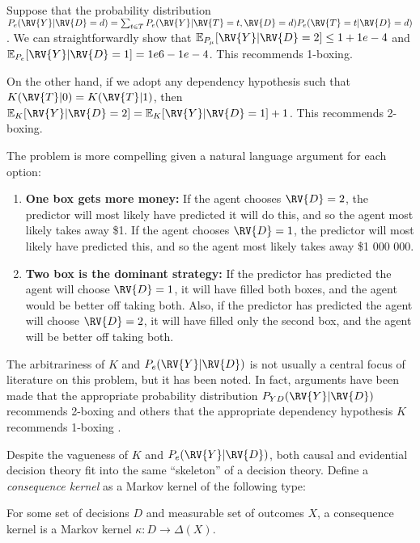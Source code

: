 \begin{example}
Suppose that the probability distribution $P_e(\RV{Y}|\RV{D}=d)=\sum_{t\in T}P_e(\RV{Y}|\RV{T}=t,\RV{D}=d)P_e(\RV{T}=t|\RV{D}=d)$. We can straightforwardly show that $\mathbb{E}_{P_\mu}[\RV{Y}|\RV{D}=2]\leq 1 + 1e-4$ and $\mathbb{E}_{P_e}[\RV{Y}|\RV{D}=1]= 1e6-1e-4$. This recommends 1-boxing.

On the other hand, if we adopt any dependency hypothesis such that $K(\RV{T}|0)=K(\RV{T}|1)$, then $\mathbb{E}_K[\RV{Y}|\RV{D}=2]=\mathbb{E}_K[\RV{Y}|\RV{D}=1]+1$. This recommends 2-boxing.

The problem is more compelling given a natural language argument for each option:
\begin{enumerate}
    \item \textbf{One box gets more money:} If the agent chooses $\RV{D}=2$, the predictor will most likely have predicted it will do this, and so the agent most likely takes away \$1. If the agent chooses $\RV{D}=1$, the predictor will most likely have predicted this, and so the agent most likely takes away \$1 000 000.
    \item \textbf{Two box is the dominant strategy:} If the predictor has predicted the agent will choose $\RV{D}=1$, it will have filled both boxes, and the agent would be better off taking both. Also, if the predictor has predicted the agent will choose $\RV{D}=2$, it will have filled only the second box, and the agent will be better off taking both.
\end{enumerate}
\end{example}

The arbitrariness of $K$ and $P_e(\RV{Y}|\RV{D})$ is not usually a central focus of literature on this problem, but it has been noted. In fact, arguments have been made that the appropriate probability distribution $P_{YD}(\RV{Y}|\RV{D})$ recommends 2-boxing \cite{jeffrey_logic_1981} and others that the appropriate dependency hypothesis $K$ recommends 1-boxing \cite{horgan_counterfactuals_1981}.

Despite the vagueness of $K$ and $P_e(\RV{Y}|\RV{D})$, both causal and evidential decision theory fit into the same ``skeleton'' of a decision theory. Define a \emph{consequence kernel} as a Markov kernel of the following type:

\begin{definition}\label{def:depend_hypoth}
For some set of decisions $D$ and measurable set of outcomes $X$, a consequence kernel is a Markov kernel $\kappa:D\to \Delta(X)$.
\end{definition}


